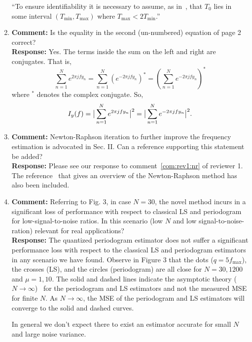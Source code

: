 \documentclass[a4paper,10pt]{article}
\begin{document}
\begin{enumerate}
``To ensure identifiability it is necessary to assume, as in~\cite{Sidiropoulos2005}, that $T_0$ lies in some interval $(T_{\text{min}}, T_{\text{max}})$ where $T_{\text{max}} < 2T_{\text{min}}$.''

\item\textbf{Comment:}
Is the equality in the second (un-numbered) equation of page 2 correct?
\\
\textbf{Response:}
Yes.  The terms inside the sum on the left and right are conjugates.  That is,
\[
\sum_{n=1}^N e^{ 2\pi j f y_n} = \sum_{n=1}^N (e^{-2\pi j f y_n})^* = \left( \sum_{n=1}^N e^{ -2\pi j f y_n} \right)^*
\]
where $^*$ denotes the complex conjugate.  So,
\[
I_y(f) = \big\vert  \sum_{n=1}^N e^{ 2\pi j f y_n}  \big\vert^2 = \big\vert  \sum_{n=1}^N e^{ -2\pi j f y_n}  \big\vert^2.
\]

\item\textbf{Comment:}
Newton-Raphson iteration to further improve the frequency estimation is advocated in Sec. II. Can a reference supporting this statement be added?
\\
\textbf{Response:} 
Please see our response to comment~\ref{com:rev1:nr} of reviewer 1.  The reference~\cite{Ypma_historical_newton_raphson_1995} that gives an overview of the Newton-Raphson method has also been included.

\item\textbf{Comment:}
Referring to Fig. 3, in case $N=30$, the novel method incurs in a significant loss of performance with respect to classical LS and periodogram for low-signal-to-noise ratios. In this scenario (low $N$ and low signal-to-noise-ration) relevant for real applications?
\\
\textbf{Response:}
The quantized periodogram estimator does not suffer a significant performance loss with respect to the classical LS and periodogram estimators in any scenario we have found.  Observe in Figure 3 that the dots ($q=5 f_{\text{max}}$), the crosses (LS), and the circles (periodogram) are all close for $N=30,1200$ and $\mu=1,10$.  The solid and dashed lines indicate the asymptotic theory ($N\to\infty$)~\cite{Quinn_sparse_noisy_SSP_2012,Quinn20013asilomar_period_est} for the periodogram and LS estimators and not the measured MSE for finite $N$.  As $N\to\infty$, the MSE of the periodogram and LS estimators will converge to the solid and dashed curves.

In general we don't expect there to exist an estimator accurate for small $N$ and large noise variance.

\end{enumerate}



{\small

}
\end{document}
